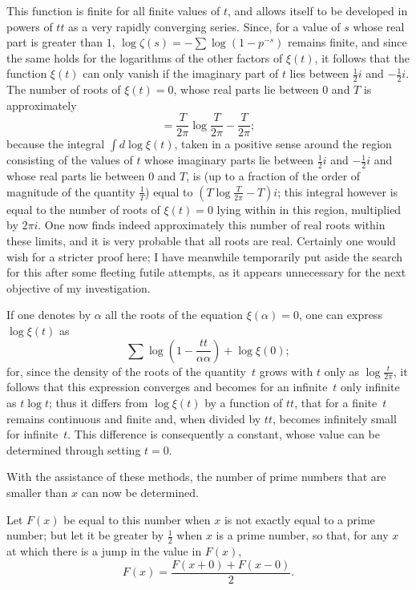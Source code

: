 \documentclass[a4paper,12pt]{article}
\begin{document}
This function is finite for all finite values of $t$, and allows
itself to be developed in powers of $tt$ as a very rapidly converging
series.  Since, for a value of $s$ whose real part is greater
than $1$,
$\log \zeta(s) = - \sum \log (1 - p^{-s})$
remains finite, and since the same holds for the logarithms of the
other factors of $\xi(t)$, it follows that the function $\xi(t)$
can only vanish if the imaginary part of $t$ lies between
$\frac{1}{2} i$ and $-\frac{1}{2} i$.  The number of roots
of $\xi(t) = 0$, whose real parts lie between $0$ and $T$
is approximately
\[ = \frac{T}{2\pi} \log \frac{T}{2\pi} - \frac{T}{2\pi};\]
because the integral $\int\limits d\log \xi(t)$, taken in a positive
sense around the region consisting of the values of $t$ whose imaginary
parts lie between $\frac{1}{2} i $ and $-\frac{1}{2}i$ and
whose real parts lie between $0$ and $T$, is (up to a fraction
of the order of magnitude of the quantity $\frac{1}{T}$) equal to
$\displaystyle \left( T \log \frac{T}{2\pi} - T \right) i$;
this integral however is equal to the number of roots of
$\xi(t) = 0$ lying within in this region, multiplied by $2 \pi i$.
One now finds indeed approximately this number of real roots
within these limits, and it is very probable that all roots are real.
Certainly one would wish for a stricter proof here; I have
meanwhile temporarily put aside the search for this
after some fleeting futile attempts, as it appears unnecessary
for the next objective of my investigation.

If one denotes by $\alpha$ all the roots of the equation
$\xi(\alpha) = 0$, one can express $\log \xi(t)$ as
\[ {\textstyle\sum} \log \left( 1 - \frac{tt}{\alpha \alpha} \right)
      + \log \xi(0);\]
for, since the density of the roots of the quantity~$t$ grows
with $t$ only as $\displaystyle \log \frac{t}{2\pi}$, it follows
that this expression converges and becomes for an infinite~$t$ only
infinite as $t \log t$; thus it differs from $\log \xi(t)$ by
a function of $tt$, that for a finite~$t$ remains continuous
and finite and, when divided by $tt$, becomes infinitely small
for infinite~$t$.  This difference is consequently a constant,
whose value can be determined through setting $t = 0$.

With the assistance of these methods, the number of prime numbers
that are smaller than $x$ can now be determined.

Let $F(x)$ be equal to this number when $x$ is not exactly
equal to a prime number; but let it be greater by $\frac{1}{2}$
when $x$ is a prime number, so that, for any $x$ at which there
is a jump in the value in $F(x)$,
\[ F(x) = \frac{F(x + 0) + F(x - 0)}{2}.\]
\end{document}
